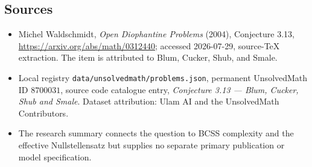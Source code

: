 \documentclass[11pt]{article}
\begin{document}
\subsection{Sources}
\begin{itemize}
\item Michel Waldschmidt, \emph{Open Diophantine Problems} (2004), Conjecture 3.13, \url{https://arxiv.org/abs/math/0312440}; accessed 2026-07-29, source-TeX extraction. The item is attributed to Blum, Cucker, Shub, and Smale.
\item Local registry \texttt{data/unsolvedmath/problems.json}, permanent UnsolvedMath ID $8700031$, source code catalogue entry, \emph{Conjecture 3.13 --- Blum, Cucker, Shub and Smale}. Dataset attribution: Ulam AI and the UnsolvedMath Contributors.
\item The research summary connects the question to BCSS complexity and the effective Nullstellensatz but supplies no separate primary publication or model specification.
\end{itemize}
\end{document}
